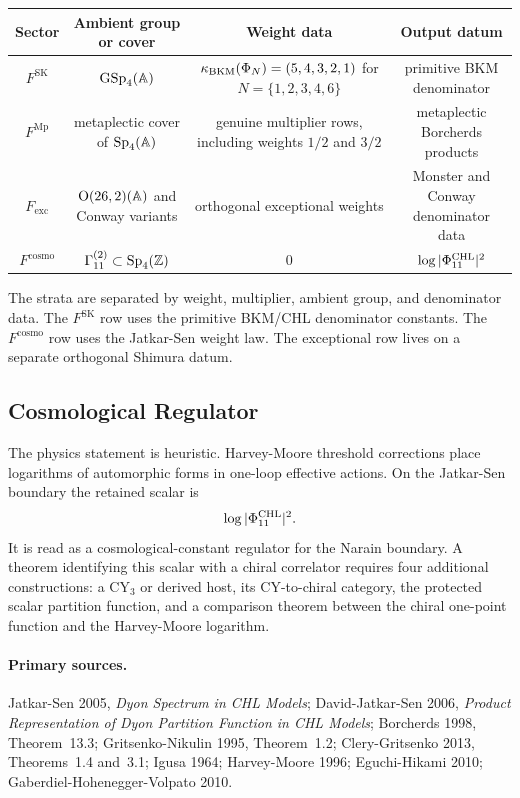 \begin{center}\small
\renewcommand{\arraystretch}{1.15}
\begin{tabular}{c|c|c|c}
Sector & Ambient group or cover & Weight data & Output datum \\
\hline
$F^{\mathrm{SK}}$ &
$\mathrm{GSp}_4(\mathbb{A})$ &
$\kappa_{\mathrm{BKM}}(\Phi_N)=(5,4,3,2,1)$ for $N=\{1,2,3,4,6\}$ &
primitive BKM denominator \\
$F^{\mathrm{Mp}}$ &
metaplectic cover of $\mathrm{Sp}_4(\mathbb{A})$ &
genuine multiplier rows, including weights $1/2$ and $3/2$ &
metaplectic Borcherds products \\
$F_{\mathrm{exc}}$ &
$\mathrm{O}(26,2)(\mathbb{A})$ and Conway variants &
orthogonal exceptional weights &
Monster and Conway denominator data \\
$F^{\mathrm{cosmo}}$ &
$\Gamma^{(2)}_{11}\subset\mathrm{Sp}_4(\mathbb{Z})$ &
$0$ &
$\log|\Phi^{\mathrm{CHL}}_{11}|^2$ \\
\end{tabular}
\end{center}

The strata are separated by weight, multiplier, ambient group, and
denominator data. The $F^{\mathrm{SK}}$ row uses the primitive
BKM/CHL denominator constants. The $F^{\mathrm{cosmo}}$ row uses the
Jatkar-Sen weight law. The exceptional row lives on a separate
orthogonal Shimura datum.

\subsection{Cosmological Regulator}

The physics statement is heuristic. Harvey-Moore threshold corrections
place logarithms of automorphic forms in one-loop effective actions. On
the Jatkar-Sen boundary the retained scalar is
\[
  \log |\Phi^{\mathrm{CHL}}_{11}|^2 .
\]
It is read as a cosmological-constant regulator for the Narain
boundary. A theorem identifying this scalar with a chiral correlator
requires four additional constructions: a CY$_3$ or derived host,
its CY-to-chiral category, the protected scalar partition function, and
a comparison theorem between the chiral one-point function and the
Harvey-Moore logarithm.

\paragraph{Primary sources.}
Jatkar-Sen 2005, \emph{Dyon Spectrum in CHL Models};
David-Jatkar-Sen 2006, \emph{Product Representation of Dyon Partition
Function in CHL Models}; Borcherds 1998, Theorem~13.3;
Gritsenko-Nikulin 1995, Theorem~1.2; Clery-Gritsenko 2013,
Theorems~1.4 and~3.1; Igusa 1964; Harvey-Moore 1996;
Eguchi-Hikami 2010; Gaberdiel-Hohenegger-Volpato 2010.
